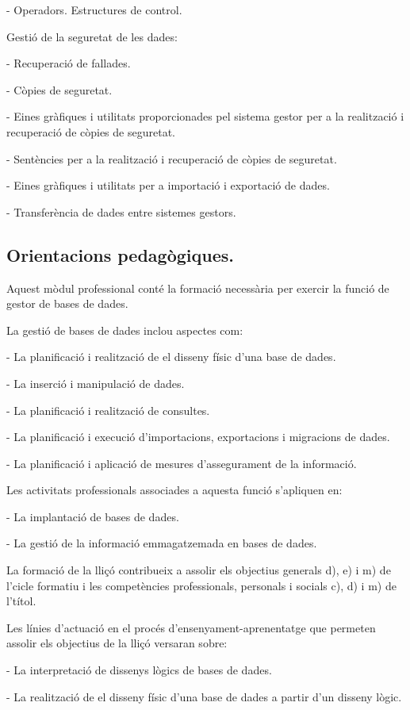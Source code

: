 \documentclass[catalan, a4paper, 12pt, titlepage]{article}
\begin{document}
- Operadors. Estructures de control.

Gestió de la seguretat de les dades:

- Recuperació de fallades.

- Còpies de seguretat.

- Eines gràfiques i utilitats proporcionades pel sistema gestor per a la realització i recuperació de còpies de seguretat.

- Sentències per a la realització i recuperació de còpies de seguretat.

- Eines gràfiques i utilitats per a importació i exportació de dades.

- Transferència de dades entre sistemes gestors.

\subsection{Orientacions pedagògiques.}

Aquest mòdul professional conté la formació necessària per exercir la funció de gestor de bases de dades.

La gestió de bases de dades inclou aspectes com:

- La planificació i realització de el disseny físic d'una base de dades.

- La inserció i manipulació de dades.

- La planificació i realització de consultes.

- La planificació i execució d'importacions, exportacions i migracions de dades.

- La planificació i aplicació de mesures d'assegurament de la informació.

Les activitats professionals associades a aquesta funció s'apliquen en:

- La implantació de bases de dades.

- La gestió de la informació emmagatzemada en bases de dades.

La formació de la lliçó contribueix a assolir els objectius generals d), e) i m) de l'cicle formatiu i les competències professionals, personals i socials c), d) i m) de l'títol.

Les línies d'actuació en el procés d'ensenyament-aprenentatge que permeten assolir els objectius de la lliçó versaran sobre:

- La interpretació de dissenys lògics de bases de dades.

- La realització de el disseny físic d'una base de dades a partir d'un disseny lògic.
\end{document}
